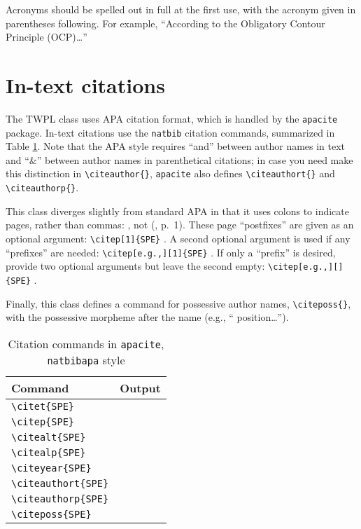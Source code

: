 \documentclass[xelatex,linguex]{TWPL}
\begin{document}
Acronyms should be spelled out in full at the first use, with the acronym given in parentheses following. For example, ``According to the Obligatory Contour Principle (OCP)\ldots''


\section{In-text citations}

The TWPL class uses APA citation format, which is handled by the \texttt{apacite} package. In-text citations use the \texttt{natbib} citation commands, summarized in Table \ref{citations}. Note that the APA style requires ``and'' between author names in text and ``\&'' between author names in parenthetical citations; in case you need make this distinction in \verb;\citeauthor{};, \texttt{apacite} also defines \verb;\citeauthort{}; and \verb;\citeauthorp{};.

This class diverges slightly from standard APA in that it uses colons to indicate pages, rather than commas: \citet[1]{SPE}, not  (\citeyear{SPE}, p.\ 1). These page ``postfixes'' are given as an optional argument: \verb;\citep[1]{SPE}; \citep[1]{SPE}. A second optional argument is used if any ``prefixes'' are needed:  \verb;\citep[e.g.,][1]{SPE}; \citep[e.g.,][1]{SPE}. If only a ``prefix'' is desired, provide two optional arguments but leave the second empty: \verb;\citep[e.g.,][]{SPE}; \citep[e.g.,][]{SPE}.

Finally, this class defines a command for possessive author names, \verb;\citeposs{};, with the possessive morpheme after the name (e.g., `` position\ldots'').

\begin{table}
	\caption{Citation commands in \texttt{apacite}, \texttt{natbibapa} style}
	\label{citations}
	\centering
	\begin{tabular}{ll}
		\toprule
		Command & Output \\
		\midrule
		\verb;\citet{SPE}; & \citet{SPE} \\
		\verb;\citep{SPE}; & \citep{SPE} \\
		\verb;\citealt{SPE}; & \citealt{SPE} \\
		\verb;\citealp{SPE}; & \citealp{SPE} \\
		\verb;\citeyear{SPE}; & \citeyear{SPE} \\
		\midrule
		\verb;\citeauthort{SPE}; & \citeauthort{SPE} \\
		\verb;\citeauthorp{SPE}; & \citeauthorp{SPE} \\
		\midrule
		\verb;\citeposs{SPE}; & \citeposs{SPE} \\
		\bottomrule
	\end{tabular}
\end{table}
\end{document}
